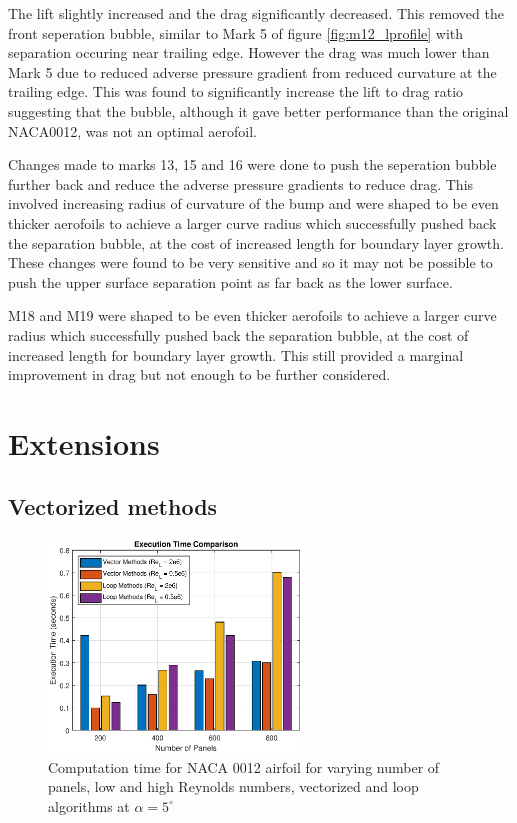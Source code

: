 \documentclass{article}
\begin{document}
The lift slightly increased and the drag significantly decreased.
This removed the front seperation bubble, similar to Mark 5 of figure \ref{fig:m12_lprofile} with separation occuring near trailing edge.
However the drag was much lower than Mark 5 due to reduced adverse pressure gradient from reduced curvature at the trailing edge.
This was found to significantly increase the lift to drag ratio suggesting that the bubble, although it gave better performance than the original NACA0012, was not an optimal aerofoil.

Changes made to marks 13, 15 and 16 were done to push the seperation bubble further back and reduce the adverse pressure gradients to reduce drag.
This involved increasing radius of curvature of the bump and 
were shaped to be even thicker aerofoils to achieve a larger curve radius which successfully pushed back the separation bubble, at the cost of increased length for boundary layer growth.
These changes were found to be very sensitive and so it may not be possible to push the upper surface separation point as far back as the lower surface.

M18 and M19 were shaped to be even thicker aerofoils to achieve a larger curve radius which successfully pushed back the separation bubble, at the cost of increased length for boundary layer growth. This still provided a marginal improvement in drag but not enough to be further considered.




\section{Extensions}

\subsection{Vectorized methods}

\begin{figure}[H]
    \centering
    \includegraphics[width=0.6\textwidth]{figures/RePanelVec_times.eps}
    \caption{Computation time for NACA 0012 airfoil for varying number of panels, low and high Reynolds numbers, vectorized and loop algorithms at $\alpha = 5^\circ$}
    \label{fig:RePanelVec_times}
\end{figure}
\end{document}
